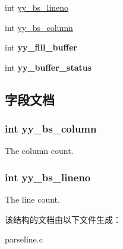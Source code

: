 \begin{DoxyCompactItemize}
\item 
int \hyperlink{structyy__buffer__state_a59c414c619ca0071fe3a091336106d82}{yy\_\-bs\_\-lineno}
\item 
int \hyperlink{structyy__buffer__state_ad9867983bbc1666304d83623cd6e3dd8}{yy\_\-bs\_\-column}
\item 
\hypertarget{structyy__buffer__state_a5e492694db97a0d7760d8cc5fd058dfd}{
int {\bfseries yy\_\-fill\_\-buffer}}
\label{structyy__buffer__state_a5e492694db97a0d7760d8cc5fd058dfd}

\item 
\hypertarget{structyy__buffer__state_a6ca09e676a787676260c558a0f731285}{
int {\bfseries yy\_\-buffer\_\-status}}
\label{structyy__buffer__state_a6ca09e676a787676260c558a0f731285}

\end{DoxyCompactItemize}


\subsection{字段文档}
\hypertarget{structyy__buffer__state_ad9867983bbc1666304d83623cd6e3dd8}{
\subsubsection[{yy\_\-bs\_\-column}]{\setlength{\rightskip}{0pt plus 5cm}int {\bf yy\_\-bs\_\-column}}}
\label{structyy__buffer__state_ad9867983bbc1666304d83623cd6e3dd8}
The column count. \hypertarget{structyy__buffer__state_a59c414c619ca0071fe3a091336106d82}{
\subsubsection[{yy\_\-bs\_\-lineno}]{\setlength{\rightskip}{0pt plus 5cm}int {\bf yy\_\-bs\_\-lineno}}}
\label{structyy__buffer__state_a59c414c619ca0071fe3a091336106d82}
The line count. 

该结构的文档由以下文件生成：\begin{DoxyCompactItemize}
\item 
parseline.c\end{DoxyCompactItemize}
